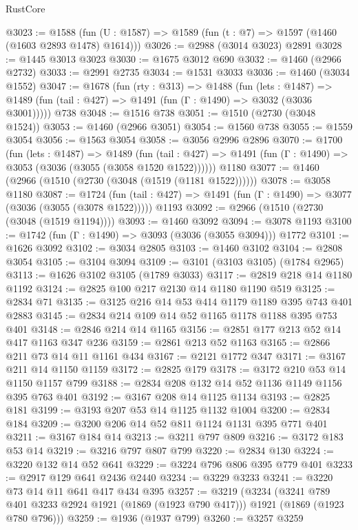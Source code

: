 \begin{lexlean}{RustCore}
\begin{coremodule}
@3023 := @1588 (fun (U : @1587) => @1589 (fun (t : @7) => @1597 (@1460 (@1603 @2893 @1478) @1614)))
@3026 := @2988 (@3014 @3023) @2891
@3028 := @1445 @3013 @3023
@3030 := @1675 @3012 @690
@3032 := @1460 (@2966 @2732)
@3033 := @2991 @2735
@3034 := @1531 @3033
@3036 := @1460 (@3034 @1552)
@3047 := @1678
    (fun (rty : @313) =>
    @1488
      (fun (lets : @1487) =>
      @1489 (fun (tail : @427) => @1491 (fun (Γ : @1490) => @3032 (@3036 @3001)))))
    @738
@3048 := @1516 @738
@3051 := @1510 (@2730 (@3048 @1524))
@3053 := @1460 (@2966 @3051)
@3054 := @1560 @738
@3055 := @1559 @3054
@3056 := @1563 @3054
@3058 := @3056 @2996 @2896
@3070 := @1700
    (fun (lets : @1487) =>
    @1489
      (fun (tail : @427) => @1491 (fun (Γ : @1490) => @3053 (@3036 (@3055 (@3058 @1520 @1522))))))
    @1180
@3077 := @1460 (@2966 (@1510 (@2730 (@3048 (@1519 (@1181 @1522))))))
@3078 := @3058 @1180
@3087 := @1724
    (fun (tail : @427) => @1491 (fun (Γ : @1490) => @3077 (@3036 (@3055 (@3078 @1522)))))
    @1193
@3092 := @2966 (@1510 (@2730 (@3048 (@1519 @1194))))
@3093 := @1460 @3092
@3094 := @3078 @1193
@3100 := @1742 (fun (Γ : @1490) => @3093 (@3036 (@3055 @3094))) @1772
@3101 := @1626 @3092
@3102 := @3034 @2805
@3103 := @1460 @3102
@3104 := @2808 @3054
@3105 := @3104 @3094
@3109 := @3101 (@3103 @3105) (@1784 @2965)
@3113 := @1626 @3102 @3105 (@1789 @3033)
@3117 := @2819 @218 @14 @1180 @1192
@3124 := @2825 @100 @217 @2130 @14 @1180 @1190 @519
@3125 := @2834 @71
@3135 := @3125 @216 @14 @53 @414 @1179 @1189 @395 @743 @401 @2883
@3145 := @2834 @214 @109 @14 @52 @1165 @1178 @1188 @395 @753 @401
@3148 := @2846 @214 @14 @1165
@3156 := @2851 @177 @213 @52 @14 @417 @1163 @347 @236
@3159 := @2861 @213 @52 @1163
@3165 := @2866 @211 @73 @14 @11 @1161 @434
@3167 := @2121 @1772 @347
@3171 := @3167 @211 @14 @1150 @1159
@3172 := @2825 @179
@3178 := @3172 @210 @53 @14 @1150 @1157 @799
@3188 := @2834 @208 @132 @14 @52 @1136 @1149 @1156 @395 @763 @401
@3192 := @3167 @208 @14 @1125 @1134
@3193 := @2825 @181
@3199 := @3193 @207 @53 @14 @1125 @1132 @1004
@3200 := @2834 @184
@3209 := @3200 @206 @14 @52 @811 @1124 @1131 @395 @771 @401
@3211 := @3167 @184 @14
@3213 := @3211 @797 @809
@3216 := @3172 @183 @53 @14
@3219 := @3216 @797 @807 @799
@3220 := @2834 @130
@3224 := @3220 @132 @14 @52 @641
@3229 := @3224 @796 @806 @395 @779 @401
@3233 := @2917 @129 @641 @2436 @2440
@3234 := @3229 @3233
@3241 := @3220 @73 @14 @11 @641 @417 @434 @395
@3257 := @3219
    (@3234
      (@3241 @789 @401 @3233 @2924 @1921 (@1869 (@1923 @790 @417)))
      @1921
      (@1869 (@1923 @780 @796)))
@3259 := @1936 (@1937 @799)
@3260 := @3257 @3259

\end{coremodule}
\end{lexlean}

